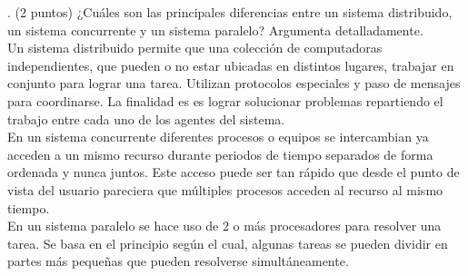 . (2 puntos) ¿Cuáles son las principales diferencias entre
un sistema distribuido, un sistema concurrente y un sistema
paralelo? Argumenta detalladamente.\\

Un sistema distribuido permite que una colección de computadoras independientes,
que pueden o no estar ubicadas en distintos lugares, trabajar en conjunto para
lograr una tarea. Utilizan protocolos especiales y paso de mensajes para
coordinarse. La finalidad es es lograr solucionar problemas repartiendo el
trabajo entre cada uno de los agentes del sistema.\\

En un sistema concurrente diferentes procesos o equipos se intercambian ya
acceden a un mismo recurso durante periodos de tiempo separados de forma
ordenada y nunca juntos. Este acceso puede ser tan rápido que desde el punto
de vista del usuario pareciera que múltiples procesos acceden al recurso al
mismo tiempo.\\

En un sistema paralelo se hace uso de 2 o más procesadores para resolver una
tarea. Se basa en el principio según el cual, algunas tareas se pueden dividir
en partes más pequeñas que pueden resolverse simultáneamente.
